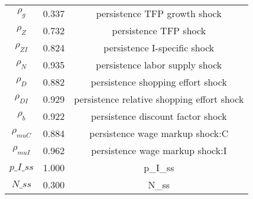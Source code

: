 \begin{center}
\begin{longtable}{ccc}
${\rho_g}$ 	 & 	 0.337 	 & 	 persistence TFP growth shock\\
${\rho_Z}$ 	 & 	 0.732 	 & 	 persistence TFP shock\\
${\rho_{ZI}}$ 	 & 	 0.824 	 & 	 persistence I-specific shock\\
${\rho_N}$ 	 & 	 0.935 	 & 	 persistence labor supply shock\\
${\rho_D}$ 	 & 	 0.882 	 & 	 persistence shopping effort shock\\
${\rho_{DI}}$ 	 & 	 0.929 	 & 	 persistence relative shopping effort shock\\
${\rho_b}$ 	 & 	 0.922 	 & 	 persistence discount factor shock\\
${\rho_{muC}}$ 	 & 	 0.884 	 & 	 persistence wage markup shock:C\\
${\rho_{muI}}$ 	 & 	 0.962 	 & 	 persistence wage markup shock:I\\
$p\_I\_ss$ 	 & 	 1.000 	 & 	 p\_I\_ss\\
$N\_ss$ 	 & 	 0.300 	 & 	 N\_ss\\
\bottomrule%
\end{longtable}
\end{center}
